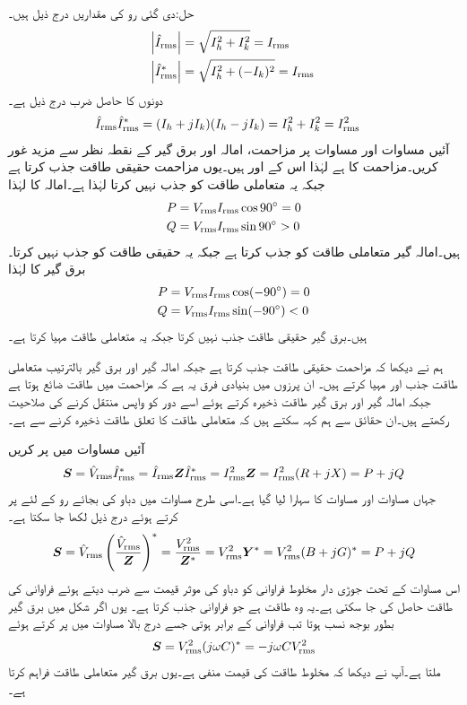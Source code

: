 حل:دی گئی رو کی مقداریں درج ذیل ہیں۔
\begin{align*}
\abs{{\hat{I}_{\textup{rms}}}}&=\sqrt{I_h^2+I_k^2}={I_{\textup{rms}}}\\
\abs{{\hat{I}^{*}_{\textup{rms}}}}&=\sqrt{I_h^2+(-I_k)^2}={I_{\textup{rms}}}
\end{align*}
دونوں  کا حاصل ضرب درج ذیل ہے۔
\begin{align}\label{مساوات_طاقت_مقدار_مساوی_مخلوط_اور_جوڑی_دور_ضرب}
{\ensuremath{\hat{I}_{\textup{rms}}}}{\ensuremath{\hat{I}^{*}_{\textup{rms}}}}&=(I_h+jI_k)(I_h-jI_k)=I_h^2+I_k^2={I^2_{\textup{rms}}}
\end{align}
آئیں مساوات  اور مساوات  پر مزاحمت، امالہ اور برق گیر کے نقطہ نظر سے مزید غور کریں۔مزاحمت کا  ہے لہٰذا اس کے  اور  ہیں۔یوں مزاحمت حقیقی طاقت جذب  کرتا ہے جبکہ یہ متعاملی طاقت کو جذب نہیں کرتا لہٰذا  ہے۔امالہ کا   لہٰذا
\begin{align}
P&={V_{\textup{rms}}} {I_{\textup{rms}}} \cos 90^{\circ}=0\\
Q&={V_{\textup{rms}}} {I_{\textup{rms}}} \sin 90^{\circ}>0
\end{align}
ہیں۔امالہ گیر متعاملی طاقت کو جذب کرتا ہے جبکہ یہ حقیقی طاقت کو جذب نہیں کرتا۔برق گیر کا  لہٰذا
\begin{align}
P&={V_{\textup{rms}}} {I_{\textup{rms}}} \cos (-90^{\circ})=0\\
Q&={V_{\textup{rms}}} {I_{\textup{rms}}} \sin (-90^{\circ})<0
\end{align}
ہیں۔برق گیر حقیقی طاقت جذب نہیں کرتا جبکہ یہ متعاملی طاقت مہیا کرتا ہے۔

ہم نے دیکھا کہ مزاحمت حقیقی طاقت جذب کرتا ہے جبکہ امالہ گیر اور برق گیر بالترتیب متعاملی طاقت جذب اور مہیا کرتے ہیں۔ ان پرزوں میں بنیادی فرق یہ ہے کہ مزاحمت میں طاقت ضائع ہوتا ہے جبکہ امالہ گیر اور برق گیر طاقت ذخیرہ کرتے ہوئے اسے دور کو واپس منتقل کرنے کی صلاحیت رکھتے ہیں۔ان حقائق سے ہم کہہ سکتے ہیں کہ متعاملی طاقت کا تعلق طاقت ذخیرہ کرنے سے  ہے۔  

آئیں مساوات  میں  پر کریں
\begin{align}
{\ensuremath{{\boldsymbol{S}}}}={\hat{V}_{\textup{rms}}}{\hat{I}^{*}_{\textup{rms}}}={\hat{I}_{\textup{rms}}}{{\boldsymbol{Z}}}{\hat{I}^{*}_{\textup{rms}}}={I^2_{\textup{rms}}}{{\boldsymbol{Z}}}={I^2_{\textup{rms}}}(R+jX)=P+jQ
\end{align}
جہاں مساوات  اور مساوات  کا سہارا لیا گیا ہے۔اسی طرح مساوات  میں دباو کی بجائے رو کے لئے پر کرتے ہوئے درج ذیل لکھا جا سکتا ہے۔
\begin{align}
{\ensuremath{{\boldsymbol{S}}}}={\hat{V}_{\textup{rms}}}\left(\frac{{\hat{V}_{\textup{rms}}}}{{{\boldsymbol{Z}}}}\right)^*=\frac{{V^2_{\textup{rms}}}}{{{\boldsymbol{Z}}^{*}}}={V^2_{\textup{rms}}} {{\boldsymbol{Y}}^{*}}={V^2_{\textup{rms}}}(B+jG)^*=P+jQ
\end{align}
اس مساوات کے تحت جوڑی دار مخلوط فراوانی کو دباو کی موثر قیمت سے ضرب دیتے ہوئے فراوانی کی طاقت حاصل کی جا سکتی ہے۔یہ وہ طاقت ہے جو فراوانی جذب کرتا ہے۔  یوں اگر شکل  میں برق گیر بطور بوجھ  نسب ہوتا تب فراوانی  کے برابر ہوتی جسے درج بالا مساوات میں پر کرتے ہوئے
\begin{align}\label{مساوات_طاقت_برق_گیر_مخلوط_طاقت}
{\ensuremath{{\boldsymbol{S}}}}={V^2_{\textup{rms}}} (j\omega C)^*=-j\omega C {V^2_{\textup{rms}}}
\end{align}
ملتا ہے۔آپ نے دیکھا کہ مخلوط طاقت کی قیمت منفی ہے۔یوں برق گیر متعاملی طاقت فراہم کرتا ہے۔

